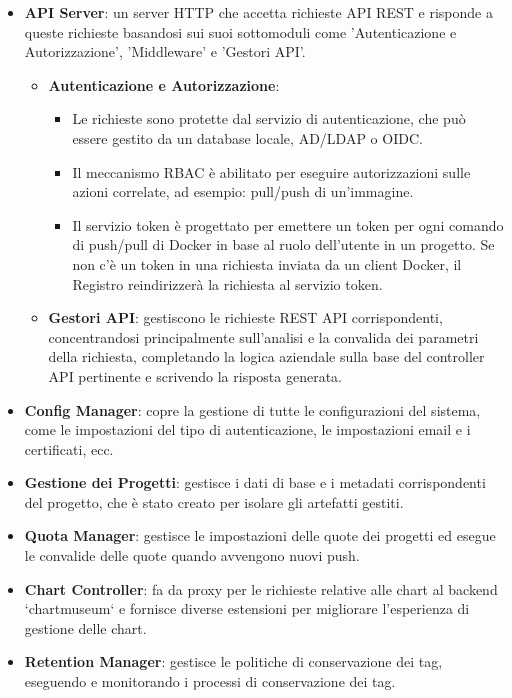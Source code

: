 \documentclass[12pt,a4paper]{report}
\begin{document}
\begin{itemize}
  \item \textbf{API Server}: un server HTTP che accetta richieste API REST e risponde a queste richieste basandosi sui suoi sottomoduli come 'Autenticazione e Autorizzazione', 'Middleware' e 'Gestori API'.
  \begin{itemize}
    \item \textbf{Autenticazione e Autorizzazione}:
    \begin{itemize}
      \item Le richieste sono protette dal servizio di autenticazione, che può essere gestito da un database locale, AD/LDAP o OIDC.
      \item Il meccanismo RBAC è abilitato per eseguire autorizzazioni sulle azioni correlate, ad esempio: pull/push di un'immagine.
      \item Il servizio token è progettato per emettere un token per ogni comando di push/pull di Docker in base al ruolo dell'utente in un progetto. Se non c'è un token in una richiesta inviata da un client Docker, il Registro reindirizzerà la richiesta al servizio token.
    \end{itemize}
    \item \textbf{Gestori API}: gestiscono le richieste REST API corrispondenti, concentrandosi principalmente sull'analisi e la convalida dei parametri della richiesta, completando la logica aziendale sulla base del controller API pertinente e scrivendo la risposta generata.
  \end{itemize}
  \item \textbf{Config Manager}: copre la gestione di tutte le configurazioni del sistema, come le impostazioni del tipo di autenticazione, le impostazioni email e i certificati, ecc.
  \item \textbf{Gestione dei Progetti}: gestisce i dati di base e i metadati corrispondenti del progetto, che è stato creato per isolare gli artefatti gestiti.
  \item \textbf{Quota Manager}: gestisce le impostazioni delle quote dei progetti ed esegue le convalide delle quote quando avvengono nuovi push.
  \item \textbf{Chart Controller}: fa da proxy per le richieste relative alle chart al backend `chartmuseum` e fornisce diverse estensioni per migliorare l'esperienza di gestione delle chart.
  \item \textbf{Retention Manager}: gestisce le politiche di conservazione dei tag, eseguendo e monitorando i processi di conservazione dei tag.

\end{itemize}
\end{document}
